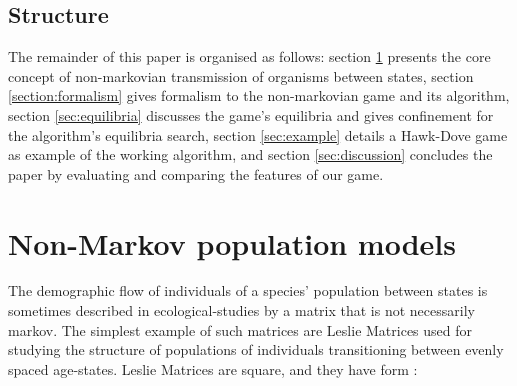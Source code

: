 \subsection{Structure}
The remainder of this paper is organised as follows: section \ref{sec:2} presents the core concept of non-markovian transmission of organisms between states, section \ref{section:formalism} gives formalism to the non-markovian game and its algorithm, section \ref{sec:equilibria} discusses the game's equilibria and gives confinement for the algorithm's equilibria search, section \ref{sec:example} details a Hawk-Dove game as example of the working algorithm, and section \ref{sec:discussion} concludes the paper by evaluating and comparing the features of our game.

\section{Non-Markov population models}\label{sec:2}

The demographic flow of individuals of a species' population between states is sometimes described in ecological-studies by a matrix that is not necessarily markov.\cite{population1}
The simplest example of such matrices are Leslie Matrices used for studying the structure of populations of individuals transitioning between evenly spaced age-states.
Leslie Matrices are square, and they have form \cite{leslie}:

